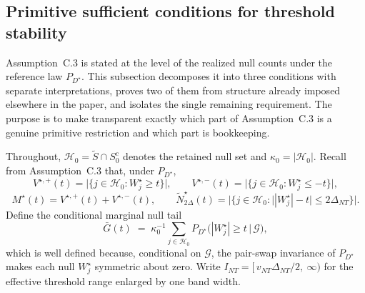 %
%
%

\subsection{Primitive sufficient conditions for threshold stability}
\label{sec:threshold-primitive}

Assumption~C.3 is stated at the level of the realized null counts under the
reference law $P_{D^\star}$.  This subsection decomposes it into three
conditions with separate interpretations, proves two of them from structure
already imposed elsewhere in the paper, and isolates the single remaining
requirement.  The purpose is to make transparent exactly which part of
Assumption~C.3 is a genuine primitive restriction and which part is
bookkeeping.

Throughout, $\mathcal{H}_0 = \widetilde S \cap S_0^{c}$ denotes the retained
null set and $\kappa_0 = |\mathcal{H}_0|$.  Recall from Assumption~C.3 that,
under $P_{D^\star}$,
\[
V^{\star,+}(t) = \bigl|\{ j \in \mathcal{H}_0 : W_j^\star \ge t \}\bigr|,
\qquad
V^{\star,-}(t) = \bigl|\{ j \in \mathcal{H}_0 : W_j^\star \le -t \}\bigr|,
\]
\[
M^\star(t) = V^{\star,+}(t) + V^{\star,-}(t),
\qquad
\widetilde N^\star_{2\Delta}(t)
 = \bigl|\{ j \in \mathcal{H}_0 : \bigl| |W_j^\star| - t \bigr| \le 2\Delta_{NT} \}\bigr| .
\]
Define the conditional marginal null tail
\begin{equation}
\label{eq:Gbar}
\bar G(t) \;=\; \kappa_0^{-1} \sum_{j \in \mathcal{H}_0}
              P_{D^\star}\bigl( |W_j^\star| \ge t \,\big|\, \mathcal{G} \bigr),
\end{equation}
which is well defined because, conditional on $\mathcal{G}$, the pair-swap
invariance of $P_{D^\star}$ makes each null $W_j^\star$ symmetric about zero.
Write $I_{NT} = [\,v_{NT}\Delta_{NT}/2,\ \infty)$ for the effective threshold
range enlarged by one band width.

